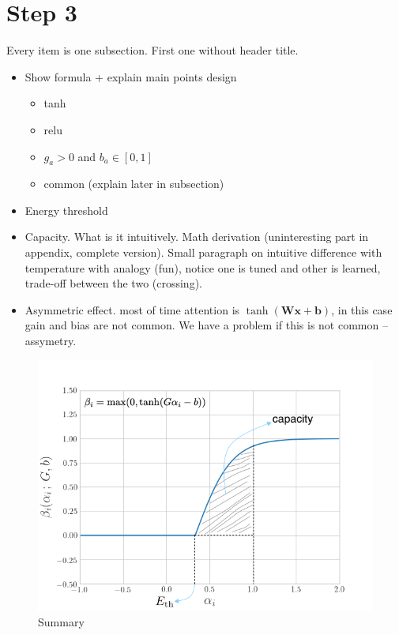 \section{Step 3}
Every item is one subsection. First one without header title.
\begin{itemize}
\item Show formula + explain main points design
	\begin{itemize}
	\item tanh
	\item relu
	\item $g_a > 0$ and $b_a \in [0,1]$
	\item common (explain later in subsection)
	\end{itemize}
\item Energy threshold
\item Capacity. What is it intuitively. Math derivation (uninteresting part in appendix, complete version). Small paragraph on intuitive difference with temperature with analogy (fun), notice one is tuned and other is learned, trade-off between the two (crossing).
\item Asymmetric effect. most of time attention is $\tanh(\mathbf{Wx} + \mathbf{b})$, in this case gain and bias are not common. We have a problem if this is not common -- assymetry.
\end{itemize}

\begin{figure}[!h]
\centering
\includegraphics[scale=0.36]{figures/tanh-annotated}
\caption{Summary}	
\label{fig:summary}
\end{figure}

